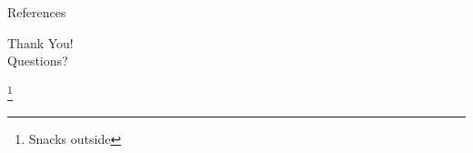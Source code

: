 \documentclass[10pt]{beamer}
\newcommand\blfootnote[1]{%
  \begingroup
  \renewcommand\thefootnote{}\footnote{#1}%
  \addtocounter{footnote}{-1}%
  \endgroup
}
\begin{document}
\begin{frame}[allowframebreaks]{References}
    \scriptsize
    
    
\end{frame}

\begin{frame}
\vfill
\begin{center}
\Large Thank You! 
\\
\large Questions?
\end{center}
\blfootnote{Snacks outside}
\end{frame}
\end{document}

